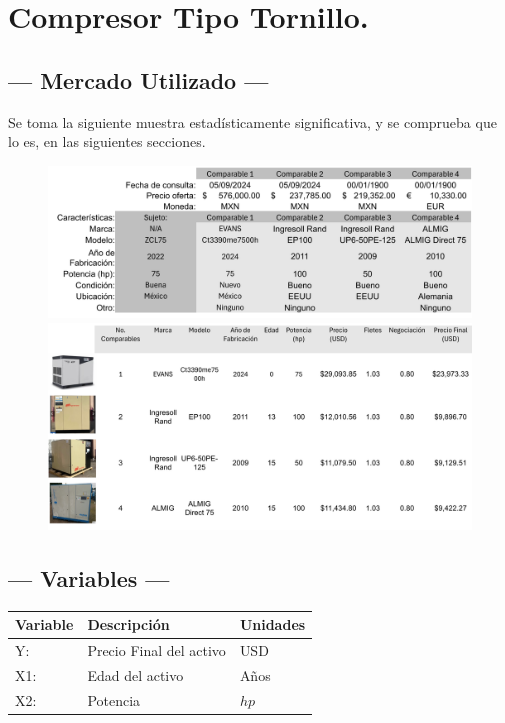 
\section{Compresor Tipo Tornillo.} %

\subsection{\centering --- Mercado Utilizado ---} %
Se toma la siguiente muestra estadísticamente significativa, y se 
comprueba que lo es, en las siguientes secciones.
\begin{figure}[hbtp!]
	\centering
\includegraphics[width=  0.7\linewidth, page = 1]{../0.imagenes/CAP_8/mercado_6_1}
\includegraphics[width=  0.9\linewidth, page = 1]{../0.imagenes/CAP_8/mercado_6_2}
\end{figure}

\subsection{\centering --- Variables ---} %
\begin{center}
  \begin{tabular}{|l|l|l|}
    \hline 
    Variable & Descripción   & Unidades\\ \hline 
    Y:  & Precio Final del activo  & USD \\ \hline 
    X1: & Edad del activo    & Años \\ \hline 
		X2: & Potencia  & \(hp\) \\ \hline 
  \end{tabular}
\end{center} 

